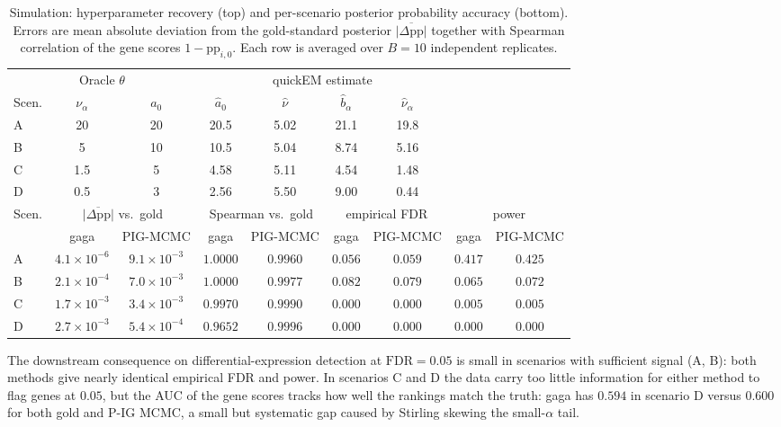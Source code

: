 \begin{table}[t]
\centering
\caption{Simulation: hyperparameter recovery (top) and per-scenario
posterior probability accuracy (bottom). Errors are mean absolute
deviation from the gold-standard posterior $\overline{|\Delta\mathrm{pp}|}$
together with Spearman correlation of the gene scores $1 - \mathrm{pp}_{i,0}$.
Each row is averaged over $B = 10$ independent replicates.}
\label{tab:gaga.sim.headline}
\smallskip
\renewcommand{\arraystretch}{1.05}
\setlength{\tabcolsep}{4pt}
{\footnotesize
\begin{tabular}{@{}lcccccccc@{}}
\toprule
\multicolumn{3}{c}{Oracle $\theta$} & \multicolumn{4}{c}{quickEM estimate} & & \\
\cmidrule(r){1-3}\cmidrule(lr){4-7}
Scen. & $\nu_\alpha$ & $a_0$ & $\hat{a}_0$ & $\hat{\nu}$ & $\hat{b}_\alpha$ & $\hat{\nu}_\alpha$ &  & \\
\midrule
A & 20  & 20 & 20.5 & 5.02 & 21.1 & 19.8 &  & \\
B & 5   & 10 & 10.5 & 5.04 & 8.74 & 5.16 &  & \\
C & 1.5 & 5  & 4.58 & 5.11 & 4.54 & 1.48 &  & \\
D & 0.5 & 3  & 2.56 & 5.50 & 9.00 & 0.44 &  & \\
\midrule
Scen. & \multicolumn{2}{c}{$\overline{|\Delta\mathrm{pp}|}$ vs.\ gold}
        & \multicolumn{2}{c}{Spearman vs.\ gold}
        & \multicolumn{2}{c}{empirical FDR}
        & \multicolumn{2}{c}{power} \\
\cmidrule(r){2-3}\cmidrule(lr){4-5}\cmidrule(lr){6-7}\cmidrule(lr){8-9}
& gaga & PIG-MCMC & gaga & PIG-MCMC & gaga & PIG-MCMC & gaga & PIG-MCMC \\
\midrule
A & $4.1\!\times\!10^{-6}$ & $9.1\!\times\!10^{-3}$ & $1.0000$ & $0.9960$
  & $0.056$ & $0.059$ & $0.417$ & $0.425$ \\
B & $2.1\!\times\!10^{-4}$ & $7.0\!\times\!10^{-3}$ & $1.0000$ & $0.9977$
  & $0.082$ & $0.079$ & $0.065$ & $0.072$ \\
C & $1.7\!\times\!10^{-3}$ & $3.4\!\times\!10^{-3}$ & $0.9970$ & $0.9990$
  & $0.000$ & $0.000$ & $0.005$ & $0.005$ \\
D & $2.7\!\times\!10^{-3}$ & $5.4\!\times\!10^{-4}$ & $0.9652$ & $0.9996$
  & $0.000$ & $0.000$ & $0.000$ & $0.000$ \\
\bottomrule
\end{tabular}}
\end{table}

The downstream consequence on differential-expression detection at
$\mathrm{FDR} = 0.05$ is small in scenarios with sufficient signal
(A, B): both methods give nearly identical empirical FDR and power.
In scenarios C and D the data carry too little information for either
method to flag genes at $0.05$, but the AUC of the gene scores tracks
how well the rankings match the truth: gaga has $0.594$ in scenario D
versus $0.600$ for both gold and P-IG MCMC, a small but systematic
gap caused by Stirling skewing the small-$\alpha$ tail.

